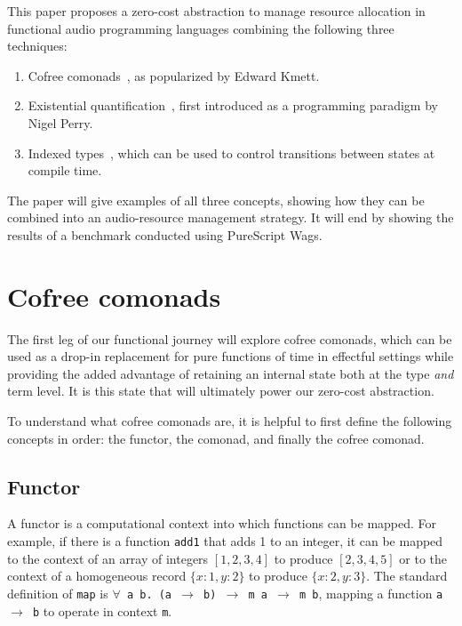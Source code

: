 \documentclass{article}
\begin{document}
This paper proposes a zero-cost abstraction to manage resource allocation in functional audio programming languages combining the following three techniques:

\begin{enumerate}
  \item Cofree comonads~\cite{kmettfree, freeman2017declarative}, as popularized by Edward Kmett.
  \item Existential quantification~\cite{perry1991implementation, laufer1994polymorphic}, first introduced as a programming paradigm by Nigel Perry.
  \item Indexed types~\cite{zenger1997indexed}, which can be used to control transitions between states at compile time.
\end{enumerate}

The paper will give examples of all three concepts, showing how they can be combined into an audio-resource management strategy. It will end by showing the results of a benchmark conducted using PureScript Wags.

\section{Cofree comonads}
\label{sec:cofree_comonads}

The first leg of our functional journey will explore cofree comonads, which can be used as a drop-in replacement for pure functions of time in effectful settings while providing the added advantage of retaining an internal state both at the type \textit{and} term level. It is this state that will ultimately power our zero-cost abstraction.

To understand what cofree comonads are, it is helpful to first define the following concepts in order: the functor, the comonad, and finally the cofree comonad.

\subsection{Functor}

A functor is a computational context into which functions can be mapped. For example, if there is a function \verb=add1= that adds 1 to an integer, it can be mapped to the context of an array of integers $[1,2,3,4]$ to produce $[2,3,4,5]$ or to the context of a homogeneous record $\{x:1,y:2\}$ to produce $\{x:2,y:3\}$. The standard definition of \verb=map= is
\texttt{$\forall$ a b. (a $\rightarrow$ b) $\rightarrow$ m a $\rightarrow$ m b}, mapping a function \texttt{a $\rightarrow$ b} to operate in context \texttt{m}.
\end{document}
